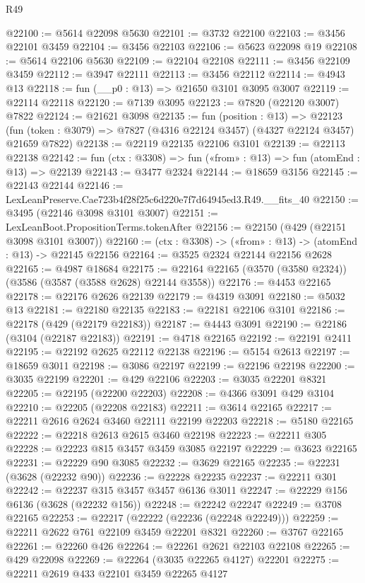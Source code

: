 \begin{lexlean}{R49}
\begin{coremodule}
@22100 := @5614 @22098 @5630
@22101 := @3732 @22100
@22103 := @3456 @22101 @3459
@22104 := @3456 @22103
@22106 := @5623 @22098 @19
@22108 := @5614 @22106 @5630
@22109 := @22104 @22108
@22111 := @3456 @22109 @3459
@22112 := @3947 @22111
@22113 := @3456 @22112
@22114 := @4943 @13
@22118 := fun (__p0 : @13) => @21650 @3101 @3095 @3007
@22119 := @22114 @22118
@22120 := @7139 @3095
@22123 := @7820 (@22120 @3007) @7822
@22124 := @21621 @3098
@22135 := fun (position : @13) =>
  @22123 (fun (token : @3079) => @7827 (@4316 @22124 @3457) (@4327 @22124 @3457) @21659 @7822)
@22138 := @22119 @22135 @22106 @3101
@22139 := @22113 @22138
@22142 := fun (ctx : @3308) => fun («from» : @13) => fun (atomEnd : @13) => @22139
@22143 := @3477 @2324
@22144 := @18659 @3156
@22145 := @22143 @22144
@22146 := LexLeanPreserve.Cae723b4f28f25c6d220e7f7d64945ed3.R49.__fits_40
@22150 := @3495 (@22146 @3098 @3101 @3007)
@22151 := LexLeanBoot.PropositionTerms.tokenAfter
@22156 := @22150 (@429 (@22151 @3098 @3101 @3007))
@22160 := (ctx : @3308) -> («from» : @13) -> (atomEnd : @13) -> @22145 @22156
@22164 := @3525 @2324 @22144 @22156 @2628
@22165 := @4987 @18684
@22175 := @22164 @22165 (@3570 (@3580 @2324)) (@3586 (@3587 (@3588 @2628) @22144 @3558))
@22176 := @4453 @22165
@22178 := @22176 @2626 @22139
@22179 := @4319 @3091
@22180 := @5032 @13
@22181 := @22180 @22135
@22183 := @22181 @22106 @3101
@22186 := @22178 (@429 (@22179 @22183))
@22187 := @4443 @3091
@22190 := @22186 (@3104 (@22187 @22183))
@22191 := @4718 @22165
@22192 := @22191 @2411
@22195 := @22192 @2625 @22112 @22138
@22196 := @5154 @2613
@22197 := @18659 @3011
@22198 := @3086 @22197
@22199 := @22196 @22198
@22200 := @3035 @22199
@22201 := @429 @22106
@22203 := @3035 @22201 @8321
@22205 := @22195 (@22200 @22203)
@22208 := @4366 @3091 @429 @3104
@22210 := @22205 (@22208 @22183)
@22211 := @3614 @22165
@22217 := @22211 @2616 @2624 @3460 @22111 @22199 @22203
@22218 := @5180 @22165
@22222 := @22218 @2613 @2615 @3460 @22198
@22223 := @22211 @305
@22228 := @22223 @815 @3457 @3459 @3085 @22197
@22229 := @3623 @22165
@22231 := @22229 @90 @3085
@22232 := @3629 @22165
@22235 := @22231 (@3628 (@22232 @90))
@22236 := @22228 @22235
@22237 := @22211 @301
@22242 := @22237 @315 @3457 @3457 @6136 @3011
@22247 := @22229 @156 @6136 (@3628 (@22232 @156))
@22248 := @22242 @22247
@22249 := @3708 @22165
@22253 := @22217 (@22222 (@22236 (@22248 @22249)))
@22259 := @22211 @2622 @761 @22109 @3459 @22201 @8321
@22260 := @3767 @22165
@22261 := @22260 @426
@22264 := @22261 @2621 @22103 @22108
@22265 := @429 @22098
@22269 := @22264 (@3035 @22265 @4127) @22201
@22275 := @22211 @2619 @433 @22101 @3459 @22265 @4127

\end{coremodule}
\end{lexlean}
